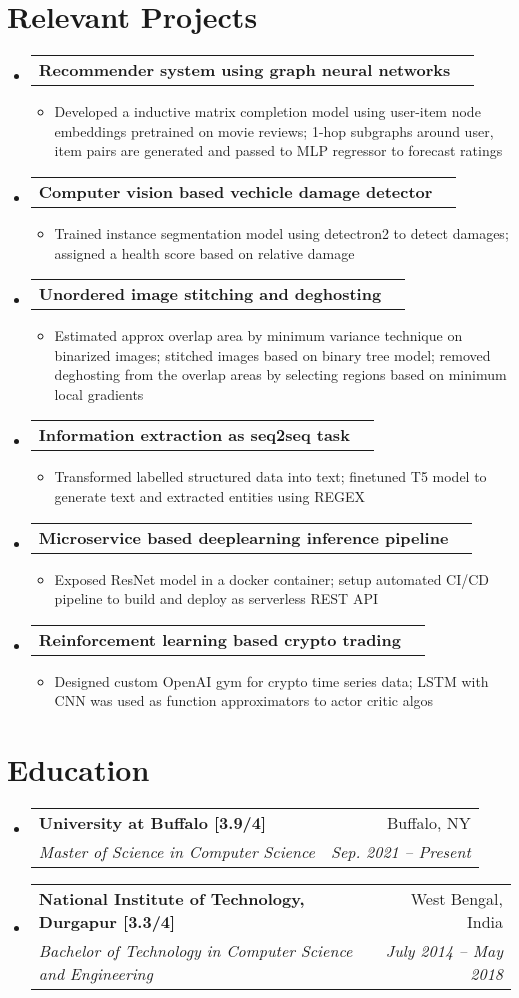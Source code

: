 \documentclass[letterpaper,10pt]{article}
\makeatletter
\newcommand{\resumeItemClean}[1]{
    \item\small{
        {#1 \vspace{-2pt}}
    }
}
\newcommand{\resumeSubheading}[4]{
  \vspace{-1pt}\item
    \begin{tabular*}{0.97\textwidth}[t]{l@{\extracolsep{\fill}}r}
      \textbf{#1} & #2 \\
      \textit{\small#3} & \textit{\small #4} \\
    \end{tabular*}\vspace{-5pt}
}
\newcommand{\projectheading}[3]{
    \vspace{-1pt}\item
        \begin{tabular*}{0.97\textwidth}{l@{\extracolsep{\fill}}r}
            \textbf{#1} & \textbf{#2} #3\\
    \end{tabular*}\vspace{-5pt}
}
\newcommand{\resumeSubHeadingListStart}{\begin{itemize}[leftmargin=*]}
\newcommand{\resumeSubHeadingListEnd}{\end{itemize}}
\newcommand{\resumeItemListStart}{\begin{itemize}}
\newcommand{\resumeItemListEnd}{\end{itemize}\vspace{-5pt}}
\makeatother
\begin{document}
\section{Relevant Projects}
    \resumeSubHeadingListStart
        \projectheading{Recommender system using graph neural networks}{}{}
            \resumeItemListStart
                \resumeItemClean
                    {Developed a inductive matrix completion model using user-item node embeddings pretrained on movie reviews; 1-hop subgraphs around user, item pairs are generated and passed to MLP regressor to forecast ratings}
            \resumeItemListEnd
        \projectheading{Computer vision based vechicle damage detector}{}{}
            \resumeItemListStart
                \resumeItemClean
                    {Trained instance segmentation model using detectron2 to detect damages; assigned a health score based on relative damage}
            \resumeItemListEnd
        \projectheading{Unordered image stitching and deghosting}{}{}
            \resumeItemListStart
                \resumeItemClean
                    {Estimated approx overlap area by minimum variance technique on binarized images; stitched images based on binary tree model; removed deghosting from the overlap areas by selecting regions based on minimum local gradients}
            \resumeItemListEnd
        \projectheading{Information extraction as seq2seq task}{}{}
            \resumeItemListStart
                \resumeItemClean
                    {Transformed labelled structured data into text; finetuned T5 model to generate text and extracted entities using REGEX}
            \resumeItemListEnd
        \projectheading{Microservice based deeplearning inference pipeline}{}{}
            \resumeItemListStart
                \resumeItemClean
                    {Exposed ResNet model in a docker container; setup automated CI/CD pipeline to build and deploy as serverless REST API}
            \resumeItemListEnd
        \projectheading{Reinforcement learning based crypto trading}{}{}
            \resumeItemListStart
                \resumeItemClean
                    {Designed custom OpenAI gym for crypto time series data; LSTM with CNN was used as function approximators to actor critic algos}
            \resumeItemListEnd
    \resumeSubHeadingListEnd
    
\section{Education}
    \resumeSubHeadingListStart
        \resumeSubheading
          {University at Buffalo [3.9/4]}{Buffalo, NY}
          {Master of Science in Computer Science}{Sep. 2021 -- Present}
        \resumeSubheading
          {National Institute of Technology, Durgapur [3.3/4]}{West Bengal, India}
          {Bachelor of Technology in Computer Science and Engineering}{July 2014 -- May 2018}
    \resumeSubHeadingListEnd
    
\end{document}
